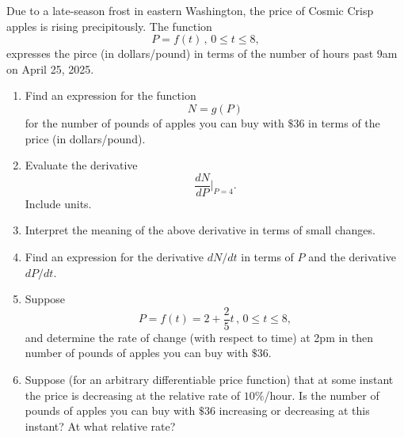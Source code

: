 \documentclass{ximera}
\begin{document}
\begin{question} \label{QLkmdfdsrr}
Due to a late-season frost in eastern Washington, the price of Cosmic Crisp apples is rising precipitously. The function 
\[
          P = f(t) \, , \, 0\leq t \leq 8 ,
\]
expresses the pirce (in dollars/pound) in terms of the number of hours past 9am on April 25, 2025.

\begin{enumerate}
\item Find an expression for the function
\[
       N = g(P)
\]
for the number of pounds of apples you can buy with $\$36$ in terms of the price (in dollars/pound).

\item Evaluate the derivative
\[
 \frac{dN}{dP}\Big|_{P=4} .
\]
Include units.

\item Interpret the meaning of the above derivative in terms of small changes.

\item Find an expression for the derivative $dN/dt$ in terms of $P$ and the derivative $dP/dt$.

\item Suppose 
\[
     P = f(t) = 2 + \frac{2}{5}t \, , \, 0\leq t \leq 8 ,
\]
and determine the rate of change (with respect to time) at 2pm in then number of pounds of apples you can buy with $\$36$.

\item Suppose (for an arbitrary differentiable price function) that at some instant the price is decreasing at the relative rate of $10\%$/hour. Is the number of pounds of apples you can buy with $\$36$ increasing or decreasing at this instant? At what relative rate?

\end{enumerate}
\end{question}
\end{document}
